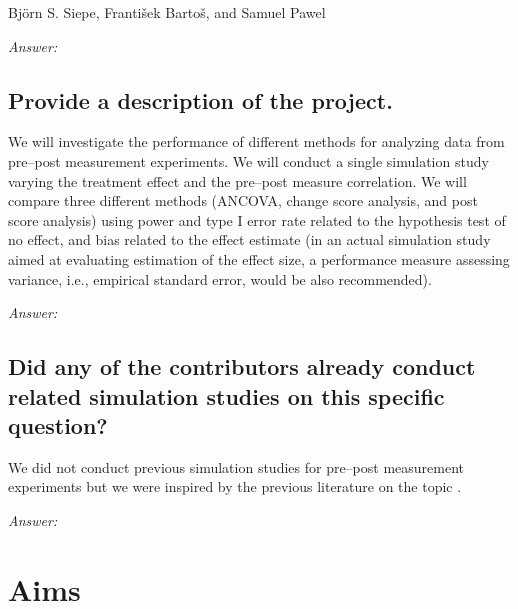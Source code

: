 \documentclass[12pt]{article}
\begin{document}
\begin{examplebox}
    Björn S. Siepe, František Bartoš, and Samuel Pawel
\end{examplebox}

\textit{Answer:}

\subsection{Provide a description of the project.}


\begin{examplebox}
    We will investigate the performance of different methods for analyzing data from pre--post measurement experiments. We will conduct a single simulation study varying the treatment effect and the pre--post measure correlation. We will compare three different methods (ANCOVA, change score analysis, and post score analysis) using power and type I error rate related to the hypothesis test of no effect, and bias related to the effect estimate (in an actual simulation study aimed at evaluating estimation of the effect size, a performance measure assessing variance, i.e., empirical standard error, would be also recommended).  
\end{examplebox}

\textit{Answer:}

\subsection{Did any of the contributors already conduct related simulation studies on this specific question?}


\begin{examplebox}
    We did not conduct previous simulation studies for pre--post measurement experiments but we were inspired by the previous literature on the topic \parencite{vickers2001use, senn2006change, van2013ancova, clifton2019correlation, ludtke2023ancova}.
\end{examplebox}

\textit{Answer:}

\section{Aims}
\end{document}
